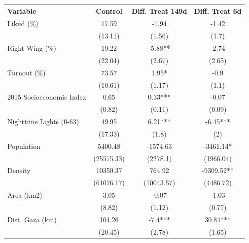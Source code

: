 
\begin{tabular}{lccc}
\toprule
Variable & Control & Diff. Treat 149d & Diff. Treat 6d\\
\midrule
Likud (\%) & 17.59 & -1.94 & -1.42\\
 & (13.11) & (1.56) & (1.7)\\
Right Wing (\%) & 19.22 & -5.88** & -2.74\\
 & (22.04) & (2.67) & (2.65)\\
Turnout (\%) & 73.57 & 1.95* & -0.9\\
\addlinespace
 & (10.61) & (1.17) & (1.1)\\
2015 Socioeconomic Index & 0.65 & 0.33*** & -0.07\\
 & (0.82) & (0.11) & (0.09)\\
Nighttime Lights (0-63) & 49.95 & 6.21*** & -6.45***\\
 & (17.33) & (1.8) & (2)\\
\addlinespace
Population & 5400.48 & -1574.63 & -3461.14*\\
 & (25575.33) & (2278.1) & (1966.04)\\
Density & 10350.37 & 764.92 & -9309.52**\\
 & (61076.17) & (10043.57) & (4486.72)\\
Area (km2) & 3.05 & -0.07 & -1.03\\
\addlinespace
 & (8.82) & (1.12) & (0.77)\\
Dist. Gaza (km) & 104.26 & -7.4*** & 30.84***\\
 & (20.45) & (2.78) & (1.65)\\
\bottomrule
\end{tabular}
